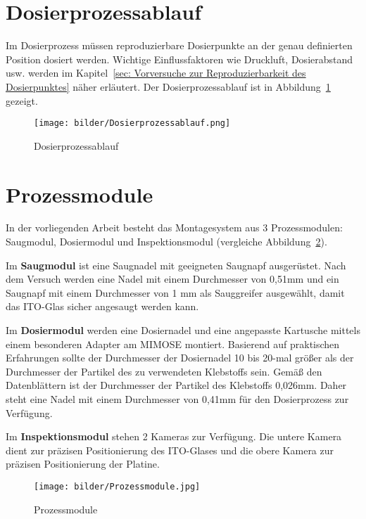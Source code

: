 \section{Dosierprozessablauf}
\label{sec:Dosierprozessablauf}
Im Dosierprozess müssen reproduzierbare Dosierpunkte an der genau definierten Position dosiert werden. Wichtige Einflussfaktoren wie Druckluft, Dosierabstand usw. werden im Kapitel~\ref{sec: Vorversuche zur Reproduzierbarkeit des Dosierpunktes} näher erläutert. Der Dosierprozessablauf ist in Abbildung~\ref{fig:Dosierprozessablauf} gezeigt.
\begin{figure}[H]
    \centering
    \texttt{[image: bilder/Dosierprozessablauf.png]}
    \caption{Dosierprozessablauf}
    \label{fig:Dosierprozessablauf}
\end{figure}

\section{Prozessmodule}
In der vorliegenden Arbeit besteht das Montagesystem aus 3 Prozessmodulen: Saugmodul, Dosiermodul und Inspektionsmodul (vergleiche  Abbildung~\ref{fig:prozessmodule}).

Im {\bf Saugmodul} ist eine Saugnadel mit geeigneten Saugnapf ausgerüstet. Nach dem Versuch werden eine Nadel mit einem Durchmesser von 0,51mm und ein Saugnapf mit einem Durchmesser von 1 mm als Sauggreifer ausgewählt, damit das ITO-Glas sicher angesaugt werden kann.

Im {\bf Dosiermodul} werden eine Dosiernadel und eine angepasste Kartusche mittels einem besonderen Adapter am MIMOSE montiert. Basierend auf praktischen Erfahrungen sollte der Durchmesser der Dosiernadel 10 bis 20-mal größer als der Durchmesser der Partikel des zu verwendeten Klebstoffs sein. Gemäß den Datenblättern ist der Durchmesser der Partikel des Klebstoffs 0,026mm. Daher steht eine Nadel mit einem Durchmesser von 0,41mm für den Dosierprozess zur Verfügung.

Im {\bf Inspektionsmodul} stehen 2 Kameras zur Verfügung. Die untere Kamera dient zur präzisen Positionierung des ITO-Glases und die obere Kamera zur präzisen Positionierung der Platine.

\begin{figure}[H]
    \centering
    \texttt{[image: bilder/Prozessmodule.jpg]}
    \caption{Prozessmodule}
    \label{fig:prozessmodule}
\end{figure}

